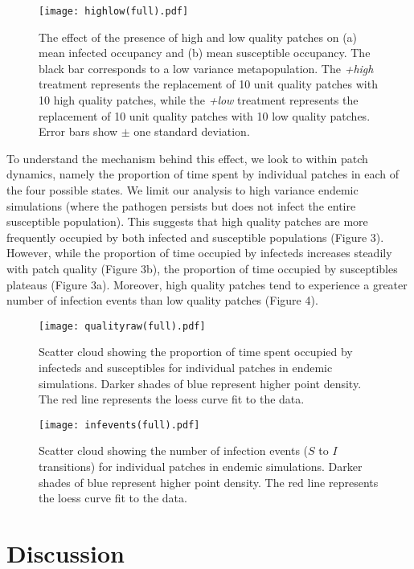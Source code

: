 \documentclass{svjour3}
\begin{document}
\begin{figure}
\label{sens}
\centering
\texttt{[image: highlow(full).pdf]}
\caption{The effect of the presence of high and low quality patches on (a) mean infected occupancy and (b) mean susceptible occupancy. The black bar corresponds to a low variance metapopulation.  The \textit{+high} treatment represents the replacement of 10 unit quality patches with 10 high quality patches, while the \textit{+low} treatment represents the replacement of 10 unit quality patches with 10 low quality patches.  Error bars show $\pm$ one standard deviation.}
\end{figure}

To understand the mechanism behind this effect, we look to within patch dynamics, namely the proportion of time spent by individual patches in each of the four possible states.  We limit our analysis to high variance endemic simulations (where the pathogen persists but does not infect the entire susceptible population).  This suggests that high quality patches are more frequently occupied by both infected and susceptible populations (Figure 3).  However, while the proportion of time occupied by infecteds increases steadily with patch quality (Figure 3b), the proportion of time occupied by susceptibles plateaus (Figure 3a).  Moreover, high quality patches tend to experience a greater number of infection events than low quality patches (Figure 4).

\begin{figure}
\label{qualityraw}
\centering
\texttt{[image: qualityraw(full).pdf]}
\caption{Scatter cloud showing the proportion of time spent occupied by infecteds and susceptibles for individual patches in endemic simulations. Darker shades of blue represent higher point density. The red line represents the loess curve fit to the data.}
\end{figure}

\begin{figure}
\label{infections}
\centering
\texttt{[image: infevents(full).pdf]}
\caption{Scatter cloud showing the number of infection events ($S$ to $I$ transitions) for individual patches in endemic simulations. Darker shades of blue represent higher point density. The red line represents the loess curve fit to the data.}
\end{figure}

\section{Discussion}
\label{discussion}
\end{document}
